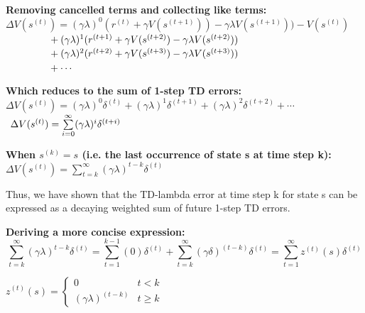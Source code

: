 \documentclass[11pt]{article}
\begin{document}
\begin{large}
    \textbf{Removing cancelled terms and collecting like terms:}\\\vspace{1mm}
    $\Delta V(s^{(t)}) = (\gamma \lambda)^0 (r^{(t)} + \gamma V(s^{(t+1)})) -  \gamma \lambda V(s^{(t+1)})) - V(s^{(t)})$\\
    $\null \hspace{15mm} + (\gamma \lambda)^1 (r^{(t+1)} + \gamma V(s^{(t+2)}) - \gamma \lambda V(s^{(t+2)}))$\\
    $\null \hspace{15mm} + (\gamma \lambda)^2 (r^{(t+2)} + \gamma V(s^{(t+3)}) - \gamma \lambda V(s^{(t+3)}))$\\
    $\null \hspace{15mm} + \cdots$
    
    \textbf{Which reduces to the sum of 1-step TD errors:}\\\vspace{1mm}
    $\Delta V(s^{(t)}) = (\gamma \lambda)^0 \delta^{(t)} + (\gamma \lambda)^1 \delta^{(t+1)} + (\gamma \lambda)^2 \delta^{(t+2)} + \cdots$\\
    $\null\;\,\Delta V(s^{(t)}) = \sum\limits_{i=0}^\infty (\gamma \lambda)^{i} \delta^{(t+i)}$
    
    \textbf{When $s^{(k)} = s$ (i.e. the last occurrence of state s at time step k):}\\\vspace{1mm}
    $\Delta V(s^{(t)}) = \sum\limits_{t=k}^\infty (\gamma \lambda)^{t-k} \delta^{(t)}$
\end{large}

Thus, we have shown that the TD-lambda error at time step k for state s can be expressed as a decaying weighted sum of future 1-step TD errors.

\begin{large}
    \textbf{Deriving a more concise expression:}
    \begin{equation}
    \sum\limits_{t=k}^\infty (\gamma \lambda)^{t-k} \delta^{(t)} = \sum\limits_{t=1}^{k-1} (0) \delta^{(t)} + \sum\limits_{t=k}^{\infty} (\gamma \delta)^{(t-k)} \delta^{(t)} = \sum\limits_{t=1}^{\infty} z^{(t)}(s) \delta^{(t)}
    \end{equation}
    
    \begin{center}
    $z^{(t)}(s) = \begin{cases} 
      0 & t < k \\
      (\gamma \lambda)^{(t-k)} & t \geq k 
     \end{cases}$
    \end{center}
\end{large}
\end{document}
